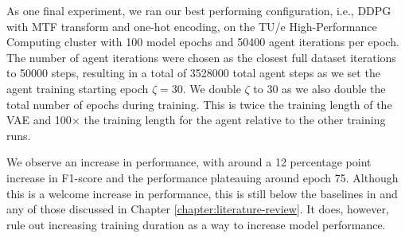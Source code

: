 As one final experiment, we ran our best performing configuration, i.e., DDPG with MTF transform and one-hot encoding, on the TU/e High-Performance Computing cluster with 100 model epochs and 50400 agent iterations per epoch.
The number of agent iterations were chosen as the closest full dataset iterations to 50000 steps, resulting in a total of 3528000 total agent steps as we set the agent training starting epoch $\zeta = 30$.
We double $\zeta$ to 30 as we also double the total number of epochs during training.
This is twice the training length of the VAE and 100$\times$ the training length for the agent relative to the other training runs.

We observe an increase in performance, with around a 12 percentage point increase in F1-score and the performance plateauing around epoch 75.
Although this is a welcome increase in performance, this is still below the baselines in \cite{zheng2019zero} and any of those discussed in Chapter \ref{chapter:literature-review}.
It does, however, rule out increasing training duration as a way to increase model performance.
